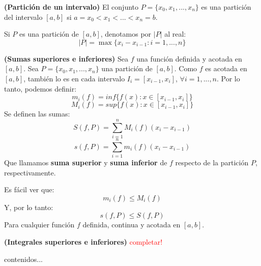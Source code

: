 \begin{definicion}
	\textbf{(Partición de un intervalo)} El conjunto $P = \{ x_0, x_1, ... , x_n\}$ es una partición del intervalo $[a, b]$ si $a = x_0 < x_1 < ... < x_n = b$. 
	
	Si $P$ es una partición de $[a,b]$, denotamos por $|P|$ al real: 
	$$ |P| = \max \{ x_i - x_{i-1} : i = 1, ... , n \} $$ 
\end{definicion}


\begin{definicion}
	\textbf{(Sumas superiores e inferiores)} Sea $f$ una función definida y acotada en $[a, b]$. Sea $P = \{ x_0, x_1, ... , x_n\}$ una partición de $[a, b]$. Como $f$ es acotada en $[a, b]$, también lo es en cada intervalo $I_i = [ x_{i-1}, x_i]$, $\forall i = 1, ..., n$. Por lo tanto, podemos definir: 
	$$ m_i(f) = inf\{f(x) : x \in [ x_{i-1}, x_i]\}$$ 
	$$ M_i(f) = sup\{f(x) : x \in [ x_{i-1}, x_i]\}$$ 
	Se definen las sumas: 
	$$ S(f, P) = \sum_{i=1}^n M_i(f) (x_i - x_{i-1})$$
	$$ s(f, P) = \sum_{i=1}^n m_i(f) (x_i - x_{i-1})$$
	Que llamamos \textbf{suma superior} y \textbf{suma inferior} de $f$ respecto de la partición $P$, respectivamente. 
\end{definicion}

\begin{nota}
	Es fácil ver que: 
	$$ m_i(f) \leq M_i (f) $$ 
	Y, por lo tanto: 
	$$ s(f, P) \leq S(f, P) $$ 
	Para cualquier función $f$ definida, continua y acotada en $[a, b]$. 
\end{nota}

\begin{definicion}
	\textbf{(Integrales superiores e inferiores)}
	\textcolor{red}{completar!}
\end{definicion}

\begin{definicion}
	contenidos...
\end{definicion}